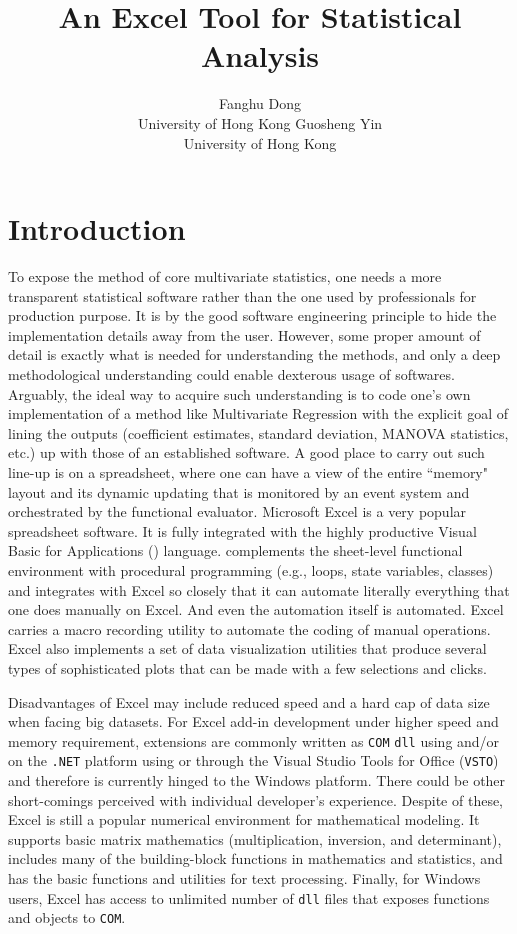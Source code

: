 \documentclass[article]{jss}
\author{Fanghu Dong\\University of Hong Kong \And Guosheng Yin\\University of Hong Kong}
\title{An Excel Tool for Statistical Analysis}
\begin{document}
  
  
  
  
  
    \section[intro]{Introduction}
        To expose the method of core multivariate statistics, one needs a more transparent statistical software rather than the one used by professionals for production purpose. It is by the good software engineering principle to hide the implementation details away from the user. However, some proper amount of detail is exactly what is needed for understanding the methods, and only a deep methodological understanding could enable dexterous usage of softwares. Arguably, the ideal way to acquire such understanding is to code one's own implementation of a method like Multivariate Regression with the explicit goal of lining the outputs (coefficient estimates, standard deviation, MANOVA statistics, etc.) up with those of an established software. A good place to carry out such line-up is on a spreadsheet, where one can have a view of the entire ``memory" layout and its dynamic updating that is monitored by an event system and orchestrated by the functional evaluator. Microsoft Excel is a very popular spreadsheet software. It is fully integrated with the highly productive Visual Basic for Applications () language.  complements the sheet-level functional environment with procedural programming (e.g., loops, state variables, classes) and integrates with Excel so closely that it can automate literally everything that one does manually on Excel. And even the automation itself is automated. Excel carries a macro recording utility to automate the coding of manual operations. Excel also implements a set of data visualization utilities that produce several types of sophisticated plots that can be made with a few selections and clicks.
  
  
        Disadvantages of Excel may include reduced speed and a hard cap of data size when facing big datasets. For Excel add-in development under higher speed and memory requirement, extensions are commonly written as \texttt{COM} \texttt{dll} using   and/or on the \texttt{.NET} platform using  or  through the Visual Studio Tools for Office (\texttt{VSTO}) and therefore is currently hinged to the Windows platform. There could be other short-comings perceived with individual developer's experience. Despite of these, Excel is still a popular numerical environment for mathematical modeling. It supports basic matrix mathematics (multiplication, inversion, and determinant), includes many of the building-block functions in mathematics and statistics, and has the basic functions and utilities for text processing. Finally, for Windows users, Excel has access to unlimited number of \texttt{dll} files that exposes functions and objects to \texttt{COM}.
  
\end{document}
